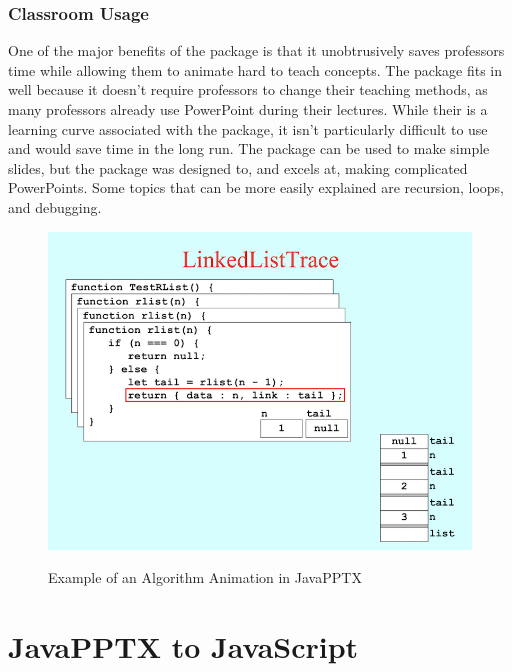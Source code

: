 \documentclass[12pt,twoside]{reedthesis}
\begin{document}
\subsection{Classroom Usage}
One of the major benefits of the package is that it unobtrusively saves professors time while allowing them to animate hard to teach concepts.  The package fits in well because it doesn't require professors to change their teaching methods, as many professors already use PowerPoint during their lectures. While their is a learning curve associated with the package, it isn't particularly difficult to use and would save time in the long run. The package can be used to make simple slides, but the package was designed to, and excels at, making complicated PowerPoints. Some topics that can be more easily explained are recursion, loops, and debugging. 
\begin{figure}[htbp] 
\begin{centering} 
\caption{Example of an Algorithm Animation in JavaPPTX} 
\includegraphics{algoanim} 
\label{subd}
\end{centering} 
\end{figure}
	

\chapter{JavaPPTX to JavaScript}
\end{document}

